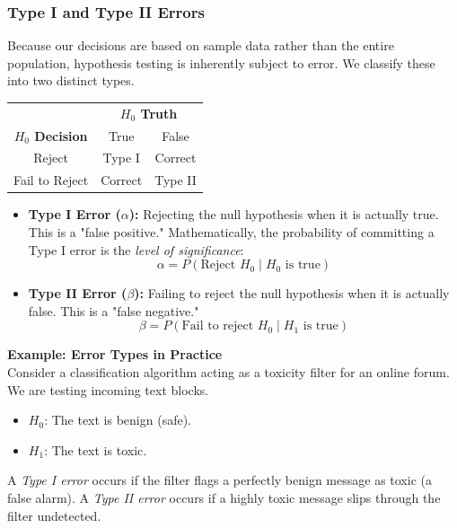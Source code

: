 \documentclass{article}
\begin{document}
\subsubsection{Type I and Type II Errors}

Because our decisions are based on sample data rather than the entire population, hypothesis testing is inherently subject to error. We classify these into two distinct types.

\begin{margintable}
\centering
\begin{tabular}{|| c c c ||} 
 \hline
 & \multicolumn{2}{c||}{\textbf{$H_0$ Truth}} \\ 
 \textbf{$H_0$ Decision} & True & False \\ [0.2ex] 
 \hline\hline
 Reject & Type I & Correct \\
 Fail to Reject & Correct & Type II \\ [1ex] 
 \hline
\end{tabular}
\captionsetup{justification=centering}
\caption{\label{tab:errors} Decision matrix for Hypothesis Testing.}
\end{margintable}

\begin{itemize}
    \item \textbf{Type I Error ($\alpha$):} Rejecting the null hypothesis when it is actually true. This is a "false positive." Mathematically, the probability of committing a Type I error is the \emph{level of significance}:
    $$ \alpha = P(\text{Reject } H_0 \mid H_0 \text{ is true}) $$
    \item \textbf{Type II Error ($\beta$):} Failing to reject the null hypothesis when it is actually false. This is a "false negative." 
    $$ \beta = P(\text{Fail to reject } H_0 \mid H_1 \text{ is true}) $$
\end{itemize}

\textbf{Example: Error Types in Practice} \\
Consider a classification algorithm acting as a toxicity filter for an online forum. We are testing incoming text blocks.
\begin{itemize}
    \item $H_0$: The text is benign (safe).
    \item $H_1$: The text is toxic.
\end{itemize}
A \emph{Type I error} occurs if the filter flags a perfectly benign message as toxic (a false alarm). A \emph{Type II error} occurs if a highly toxic message slips through the filter undetected. 
\end{document}
